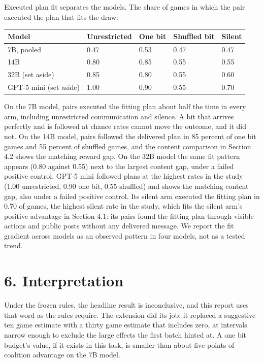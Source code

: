 \documentclass[11pt]{article}
\begin{document}
Executed plan fit separates the models. The share of games in which the
pair executed the plan that fits the draw:

{\def\LTcaptype{none} %
\begin{longtable}[]{@{}lllll@{}}
\toprule\noalign{}
Model & Unrestricted & One bit & Shuffled bit & Silent \\
\midrule\noalign{}
\endhead
\bottomrule\noalign{}
\endlastfoot
7B, pooled & 0.47 & 0.53 & 0.47 & 0.47 \\
14B & 0.80 & 0.85 & 0.55 & 0.55 \\
32B (set aside) & 0.85 & 0.80 & 0.55 & 0.60 \\
GPT-5 mini (set aside) & 1.00 & 0.90 & 0.55 & 0.70 \\
\end{longtable}
}

On the 7B model, pairs executed the fitting plan about half the time in
every arm, including unrestricted communication and silence. A bit that
arrives perfectly and is followed at chance rates cannot move the
outcome, and it did not. On the 14B model, pairs followed the delivered
plan in 85 percent of one bit games and 55 percent of shuffled games,
and the content comparison in Section 4.2 shows the matching reward gap.
On the 32B model the same fit pattern appears (0.80 against 0.55) next
to the largest content gap, under a failed positive control. GPT-5 mini
followed plans at the highest rates in the study (1.00 unrestricted,
0.90 one bit, 0.55 shuffled) and shows the matching content gap, also
under a failed positive control. Its silent arm executed the fitting
plan in 0.70 of games, the highest silent rate in the study, which fits
the silent arm's positive advantage in Section 4.1: its pairs found the
fitting plan through visible actions and public posts without any
delivered message. We report the fit gradient across models as an
observed pattern in four models, not as a tested trend.

\section{6. Interpretation}\label{interpretation}

Under the frozen rules, the headline result is inconclusive, and this
report uses that word as the rules require. The extension did its job:
it replaced a suggestive ten game estimate with a thirty game estimate
that includes zero, at intervals narrow enough to exclude the large
effects the first batch hinted at. A one bit budget's value, if it
exists in this task, is smaller than about five points of coalition
advantage on the 7B model.
\end{document}
